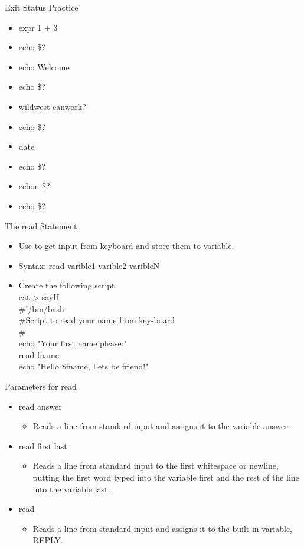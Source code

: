 \documentclass{beamer}
\begin{document}
\begin{frame}{Exit Status Practice}
\begin{itemize}
\item expr 1 + 3
\item echo \$?
\item echo Welcome
\item echo \$?
\item wildwest canwork?
\item echo \$?
\item date
\item echo \$?
\item echon \$?
\item echo \$?
\end{itemize}
\end{frame}

\begin{frame}{The read Statement}
\begin{itemize}
\item Use to get input from keyboard and store them to variable.
\item Syntax: read varible1 varible2 varibleN
\item Create the following script \\
cat > sayH \\
\#!/bin/bash  \\
\#Script to read your name from key-board \\
\# \\
echo "Your first name please:" \\
read fname \\
echo "Hello \$fname, Lets be friend!"
\end{itemize}
\end{frame}

\begin{frame}{Parameters for read}
\begin{itemize}
\item read answer
\begin{itemize}
\item Reads a line from standard input and assigns it to the variable answer. 
\end{itemize}
\item read first last 
\begin{itemize}
\item Reads a line from standard input to the first whitespace or newline, putting the first word typed into the variable first and the rest of the line into the variable last. 
\end{itemize}
\item read 
\begin{itemize}
\item Reads a line from standard input and assigns it to the built-in variable, REPLY.
\end{itemize}
\end{itemize}
\end{frame}
\end{document}
